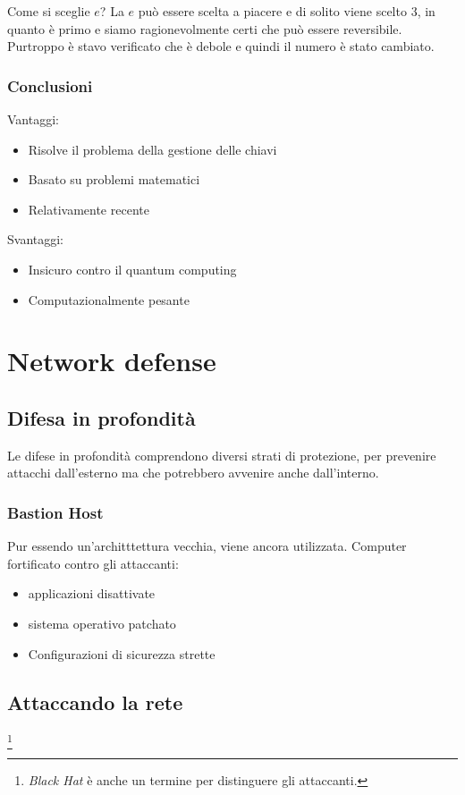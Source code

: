 \documentclass{book}
\begin{document}
Come si sceglie $e$? La $e$ può essere scelta a piacere e di solito viene scelto $3$, in quanto è primo e siamo ragionevolmente certi che può essere reversibile. Purtroppo è stavo verificato che è debole e quindi il numero è stato cambiato.

\subsubsection{Conclusioni}

Vantaggi:
\begin{itemize}
\item Risolve il problema della gestione delle chiavi
\item Basato su problemi matematici
\item Relativamente recente
\end{itemize}

Svantaggi:
\begin{itemize}
\item Insicuro contro il quantum computing
\item Computazionalmente pesante
\end{itemize}


\section{Network defense}

\subsection{Difesa in profondità}

Le difese in profondità comprendono diversi strati di protezione, per prevenire attacchi dall'esterno ma che potrebbero avvenire anche dall'interno.

\subsubsection{Bastion Host}

Pur essendo un'architttettura vecchia, viene ancora utilizzata.
Computer fortificato contro gli attaccanti:
\begin{itemize}
\item applicazioni disattivate
\item sistema operativo patchato
\item Configurazioni di sicurezza strette
\end{itemize}

\subsection{Attaccando la rete}\footnote{\textit{Black Hat} è anche un termine per distinguere gli attaccanti.}
\end{document}
